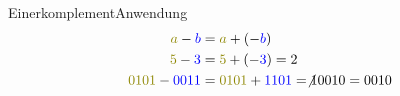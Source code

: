 \documentclass[xelatex,aspectratio=169]{beamer}
\begin{document}
\begin{frame}{Einerkomplement}{Anwendung}
  \begin{align*}
    \textcolor{olive}{a} - \textcolor{blue}{b}       & = \textcolor{olive}{a} + (-\textcolor{blue}{b})                         \\
    \textcolor{olive}{5} - \textcolor{blue}{3}       & = \textcolor{olive}{5} + (-\textcolor{blue}{3}) = 2                     \\
    \textcolor{olive}{0101} - \textcolor{blue}{0011} & = \textcolor{olive}{0101} + \textcolor{blue}{1101} = \not{1}0010 = 0010 \\
  \end{align*}
\end{frame}
\end{document}
